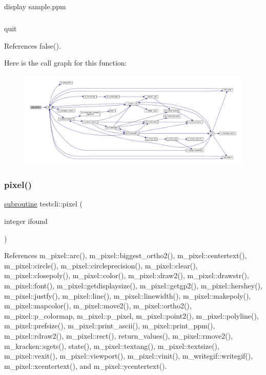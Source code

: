 display sample.\+ppm \subparagraph*{}

quit 

References false().

Here is the call graph for this function\+:
\nopagebreak
\begin{figure}[H]
\begin{center}
\leavevmode
\includegraphics[width=350pt]{shell_8f90_a39c21619b08a3c22f19e2306efd7f766_cgraph}
\end{center}
\end{figure}
\mbox{\label{shell_8f90_a5c599e945a5e0c9c8954969ea48587cf}} 
\subsubsection{\texorpdfstring{pixel()}{pixel()}}
{\footnotesize\ttfamily \hyperlink{M__stopwatch_83_8txt_acfbcff50169d691ff02d4a123ed70482}{subroutine} testcli\+::pixel (\begin{DoxyParamCaption}\item[{integer}]{ifound }\end{DoxyParamCaption})}



References m\+\_\+pixel\+::arc(), m\+\_\+pixel\+::biggest\+\_\+ortho2(), m\+\_\+pixel\+::centertext(), m\+\_\+pixel\+::circle(), m\+\_\+pixel\+::circleprecision(), m\+\_\+pixel\+::clear(), m\+\_\+pixel\+::closepoly(), m\+\_\+pixel\+::color(), m\+\_\+pixel\+::draw2(), m\+\_\+pixel\+::drawstr(), m\+\_\+pixel\+::font(), m\+\_\+pixel\+::getdisplaysize(), m\+\_\+pixel\+::getgp2(), m\+\_\+pixel\+::hershey(), m\+\_\+pixel\+::justfy(), m\+\_\+pixel\+::line(), m\+\_\+pixel\+::linewidth(), m\+\_\+pixel\+::makepoly(), m\+\_\+pixel\+::mapcolor(), m\+\_\+pixel\+::move2(), m\+\_\+pixel\+::ortho2(), m\+\_\+pixel\+::p\+\_\+colormap, m\+\_\+pixel\+::p\+\_\+pixel, m\+\_\+pixel\+::point2(), m\+\_\+pixel\+::polyline(), m\+\_\+pixel\+::prefsize(), m\+\_\+pixel\+::print\+\_\+ascii(), m\+\_\+pixel\+::print\+\_\+ppm(), m\+\_\+pixel\+::rdraw2(), m\+\_\+pixel\+::rect(), return\+\_\+values(), m\+\_\+pixel\+::rmove2(), m\+\_\+kracken\+::sgets(), state(), m\+\_\+pixel\+::textang(), m\+\_\+pixel\+::textsize(), m\+\_\+pixel\+::vexit(), m\+\_\+pixel\+::viewport(), m\+\_\+pixel\+::vinit(), m\+\_\+writegif\+::writegif(), m\+\_\+pixel\+::xcentertext(), and m\+\_\+pixel\+::ycentertext().

